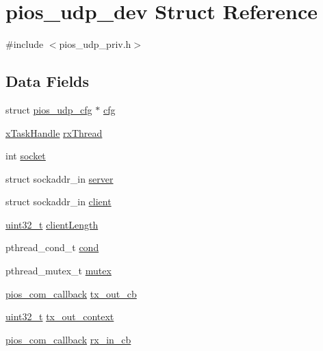 \hypertarget{structpios__udp__dev}{\section{pios\-\_\-udp\-\_\-dev Struct Reference}
\label{structpios__udp__dev}
}


{\ttfamily \#include $<$pios\-\_\-udp\-\_\-priv.\-h$>$}

\subsection*{Data Fields}
\begin{DoxyCompactItemize}
\item 
struct \hyperlink{structpios__udp__cfg}{pios\-\_\-udp\-\_\-cfg} $\ast$ \hyperlink{structpios__udp__dev_a94cd33f1f894b923e930feb577f0a882}{cfg}
\item 
\hyperlink{_common_2_libraries_2_free_r_t_o_s_2_source_2include_2task_8h_a271ae40d5db07d928a113766505a0965}{x\-Task\-Handle} \hyperlink{structpios__udp__dev_aaa9155c25ada819e91b4e8041bd67e7a}{rx\-Thread}
\item 
int \hyperlink{structpios__udp__dev_ad5d46c15339fd00e047ab83898aabc20}{socket}
\item 
struct sockaddr\-\_\-in \hyperlink{structpios__udp__dev_a802c81cfccce81f5e9774a3f2fb7a449}{server}
\item 
struct sockaddr\-\_\-in \hyperlink{structpios__udp__dev_a91da9fed751f33b5fc4c9ae2cc1a0328}{client}
\item 
\hyperlink{stdint_8h_a435d1572bf3f880d55459d9805097f62}{uint32\-\_\-t} \hyperlink{structpios__udp__dev_ac097971990d8961a5a9eb6df4c5922d8}{client\-Length}
\item 
pthread\-\_\-cond\-\_\-t \hyperlink{structpios__udp__dev_aa2ee1caa6f101cfa029b471fbfa40f9c}{cond}
\item 
pthread\-\_\-mutex\-\_\-t \hyperlink{structpios__udp__dev_ad95bd14436ecf5291f717b5e1d02ceea}{mutex}
\item 
\hyperlink{group___p_i_o_s___c_o_m_ga23f1888821f1f74a50c02adc459df597}{pios\-\_\-com\-\_\-callback} \hyperlink{structpios__udp__dev_a72acdfb1fbde453ec2ba74b7057c065a}{tx\-\_\-out\-\_\-cb}
\item 
\hyperlink{stdint_8h_a435d1572bf3f880d55459d9805097f62}{uint32\-\_\-t} \hyperlink{structpios__udp__dev_aa9d5eb1eef4914bc11ba97d5e425184b}{tx\-\_\-out\-\_\-context}
\item 
\hyperlink{group___p_i_o_s___c_o_m_ga23f1888821f1f74a50c02adc459df597}{pios\-\_\-com\-\_\-callback} \hyperlink{structpios__udp__dev_ae0e9d717bbca5d5a4a741632fce620f4}{rx\-\_\-in\-\_\-cb}

\end{DoxyCompactItemize}
